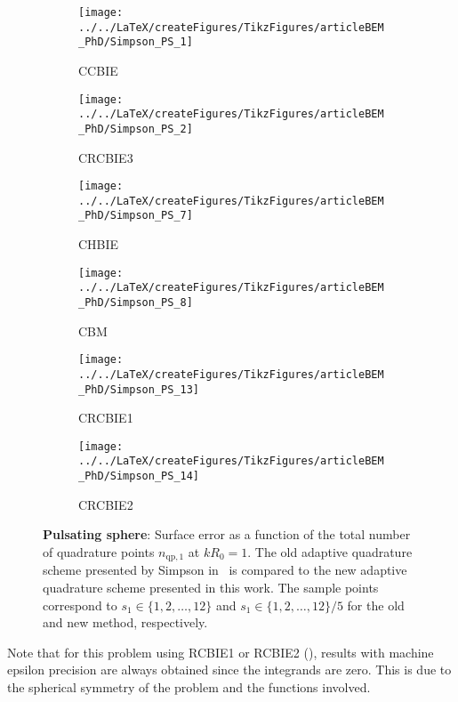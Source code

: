 \begin{figure}
	\begin{subfigure}{0.49\textwidth}
		\centering
		\texttt{[image: ../../LaTeX/createFigures/TikzFigures/articleBEM\_PhD/Simpson\_PS\_1]}
		\caption{CCBIE}
	\end{subfigure}%
	\hspace*{0.02\textwidth}%
	\begin{subfigure}{0.49\textwidth}
		\centering
		\texttt{[image: ../../LaTeX/createFigures/TikzFigures/articleBEM\_PhD/Simpson\_PS\_2]}
		\caption{CRCBIE3}
	\end{subfigure}
	\par\bigskip
	\par\bigskip
	\begin{subfigure}{0.49\textwidth}
		\centering
		\texttt{[image: ../../LaTeX/createFigures/TikzFigures/articleBEM\_PhD/Simpson\_PS\_7]}
		\caption{CHBIE}
	\end{subfigure}%
	\hspace*{0.02\textwidth}%
	\begin{subfigure}{0.49\textwidth}
		\centering
		\texttt{[image: ../../LaTeX/createFigures/TikzFigures/articleBEM\_PhD/Simpson\_PS\_8]}
		\caption{CBM}
	\end{subfigure}
	\par\bigskip
	\par\bigskip
	\begin{subfigure}{0.49\textwidth}
		\centering
		\texttt{[image: ../../LaTeX/createFigures/TikzFigures/articleBEM\_PhD/Simpson\_PS\_13]}
		\caption{CRCBIE1}
	\end{subfigure}%
	\hspace*{0.02\textwidth}%
	\begin{subfigure}{0.49\textwidth}
		\centering
		\texttt{[image: ../../LaTeX/createFigures/TikzFigures/articleBEM\_PhD/Simpson\_PS\_14]}
		\caption{CRCBIE2}
	\end{subfigure}
	\caption{\textbf{Pulsating sphere}: Surface error as a function of the total number of quadrature points $n_{\mathrm{qp,1}}$ at $kR_0=1$.  The old adaptive quadrature scheme presented by Simpson in~\cite{Simpson2014aib} is compared to the new adaptive quadrature scheme presented in this work. The sample points correspond to $s_1\in\{1,2,\dots,12\}$ and $s_1\in\{1,2,\dots,12\}/5$ for the old and new method, respectively.}
	\label{Fig3:Simpson_PS_1}
\end{figure}
Note that for this problem using RCBIE1 or RCBIE2 (), results with machine epsilon precision are always obtained since the integrands are zero. This is due to the spherical symmetry of the problem and the functions involved.

